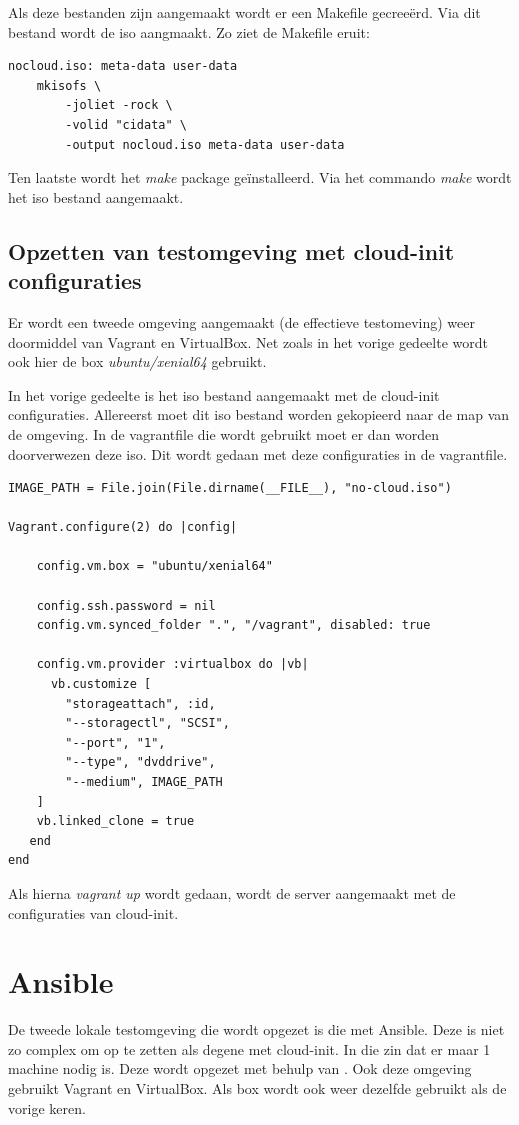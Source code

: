 Als deze bestanden zijn aangemaakt wordt er een Makefile gecreeërd. Via dit bestand wordt de iso aangmaakt. Zo ziet de Makefile eruit:
\begin{lstlisting}
nocloud.iso: meta-data user-data
    mkisofs \
        -joliet -rock \
        -volid "cidata" \
        -output nocloud.iso meta-data user-data
\end{lstlisting}

Ten laatste wordt het \textit{make} package geïnstalleerd. Via het commando \textit{make} wordt het iso bestand aangemaakt.

\subsection{Opzetten van testomgeving met cloud-init configuraties}
Er wordt een tweede omgeving aangemaakt (de effectieve testomeving) weer doormiddel van Vagrant en VirtualBox. Net zoals in het vorige gedeelte wordt ook hier de box \textit{ubuntu/xenial64} gebruikt.

In het vorige gedeelte is het iso bestand aangemaakt met de cloud-init configuraties. Allereerst moet dit iso bestand worden gekopieerd naar de map van de omgeving. In de vagrantfile die wordt gebruikt moet er dan worden doorverwezen deze iso. Dit wordt gedaan met deze configuraties in de vagrantfile.
\begin{lstlisting}
IMAGE_PATH = File.join(File.dirname(__FILE__), "no-cloud.iso")

Vagrant.configure(2) do |config|
	
    config.vm.box = "ubuntu/xenial64"
	
    config.ssh.password = nil	
    config.vm.synced_folder ".", "/vagrant", disabled: true
	
    config.vm.provider :virtualbox do |vb|
	  vb.customize [
	    "storageattach", :id,
	    "--storagectl", "SCSI",
	    "--port", "1",
	    "--type", "dvddrive",
	    "--medium", IMAGE_PATH
	]
	vb.linked_clone = true
   end
end
\end{lstlisting}
Als hierna \textit{vagrant up} wordt gedaan, wordt de server aangemaakt met de configuraties van cloud-init.
 
\section{Ansible}
De tweede lokale testomgeving die wordt opgezet is die met Ansible. Deze is niet zo complex om op te zetten als degene met cloud-init. In die zin dat er maar 1 machine nodig is. Deze wordt opgezet met behulp van \autocite{ansibleVagrant}. Ook deze omgeving gebruikt Vagrant en VirtualBox. Als box wordt ook weer dezelfde gebruikt als de vorige keren. 

